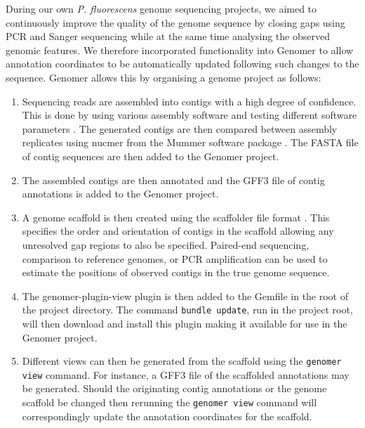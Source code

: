 \documentclass[10pt]{article}
\begin{document}
During our own \emph{P. fluorescens} genome sequencing projects, we aimed to
continuously improve the quality of the genome sequence by closing gaps using
PCR and Sanger sequencing while at the same time analysing the observed genomic
features. We therefore incorporated functionality into Genomer to allow
annotation coordinates to be automatically updated following such changes to
the sequence. Genomer allows this by organising a genome project as follows:

\begin{enumerate}

\item{Sequencing reads are assembled into contigs with a high degree of
confidence. This is done by using various assembly software and testing
different software parameters \cite{earl2011}. The generated contigs are then
compared between assembly replicates using nucmer from the Mummer software
package \cite{kurtz2004}. The FASTA file of contig sequences are then added to
the Genomer project.}

\item{The assembled contigs are then annotated and the GFF3 file of contig
annotations is added to the Genomer project.}

\item{A genome scaffold is then created using the scaffolder file format
\cite{barton2012}. This specifies the order and orientation of contigs in the
scaffold allowing any unresolved gap regions to also be specified. Paired-end
sequencing, comparison to reference genomes, or PCR amplification can be used
to estimate the positions of observed contigs in the true genome sequence.}
  
\item{The genomer-plugin-view plugin is then added to the Gemfile in the root
of the project directory. The command \verb+bundle update+, run in the project
root, will then download and install this plugin making it available for use in
the Genomer project.}
  
\item{Different views can then be generated from the scaffold using the
\verb+genomer view+ command. For instance, a GFF3 file of the scaffolded
annotations may be generated. Should the originating contig annotations or the
genome scaffold be changed then rerunning the \verb+genomer view+ command will
correspondingly update the annotation coordinates for the scaffold.}

\end{enumerate}
  
\end{document}
